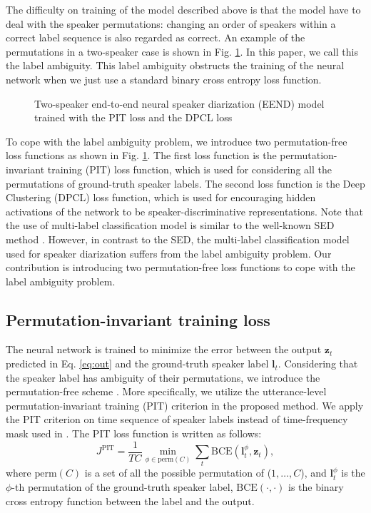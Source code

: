 \documentclass[a4paper]{article}
\renewcommand{\v}[1]{\ensuremath{\mathbf{#1}}}
\newcommand{\pdffigure}[3][width=0.7\linewidth]{
	\begin{figure}[tb]
	\begin{center}
    \IfFileExists{./#2.pdf}{
	    \texttt{[image: \#2.pdf]}
	}{
	    \texttt{[image: \#2.pdf]}
    }
    \end{center}
    \caption{#3}
	\label{fig:#2}
	\end{figure}
}
\begin{document}
The difficulty on training of the model described above is that the model have to deal with the speaker permutations: changing an order of speakers within a correct label sequence is also regarded as correct. An example of the permutations in a two-speaker case is shown in Fig. \ref{fig:trainingflow}.
In this paper, we call this the label ambiguity. This label ambiguity obstructs the training of the neural network when we just use a standard binary cross entropy loss function.

\pdffigure[width=0.92\linewidth]{trainingflow}{Two-speaker end-to-end neural speaker diarization (EEND) model trained with the PIT loss and the DPCL loss}

To cope with the label ambiguity problem, we introduce two permutation-free loss functions as shown in Fig. \ref{fig:trainingflow}.
The first loss function is the permutation-invariant training (PIT) loss function, which is used for considering all the permutations of ground-truth speaker labels. The second loss function is the Deep Clustering (DPCL) loss function, which is used for encouraging hidden activations of the network to be speaker-discriminative representations.
Note that the use of multi-label classification model is similar to the well-known SED method \cite{Adavanne2017}.
However, in contrast to the SED, the multi-label classification model used for speaker diarization suffers from the label ambiguity problem.
Our contribution is introducing two permutation-free loss functions to cope with the label ambiguity problem.

\subsection{Permutation-invariant training loss}

The neural network is trained to minimize the error between the output $\v{z}_t$ predicted in Eq. \ref{eq:out} and the ground-truth speaker label $\v{l}_t$.
Considering that the speaker label has ambiguity of their permutations, we introduce the permutation-free scheme \cite{Hershey2016, Yu2017}. More specifically, we utilize the utterance-level permutation-invariant training (PIT) criterion \cite{Kolbak2017} in the proposed method.
We apply the PIT criterion on time sequence of speaker labels instead of time-frequency mask used in \cite{Kolbak2017}.
The PIT loss function is written as follows:
\begin{equation}\label{eq:pf}
    J^{\text{PIT}} = \frac{1}{TC} \min_{\phi \in \mathrm{perm}(C)} \sum_t \mathrm{BCE}(\v{l}_t^\phi, \v{z}_t),
\end{equation}
where $\mathrm{perm}(C)$ is a set of all the possible permutation of ($1,\dots,C$),
and $\v{l}_t^\phi$ is the $\phi$-th permutation of the ground-truth speaker label, $\mathrm{BCE}(\cdot, \cdot)$ is the binary cross entropy function between the label and the output.
\end{document}
